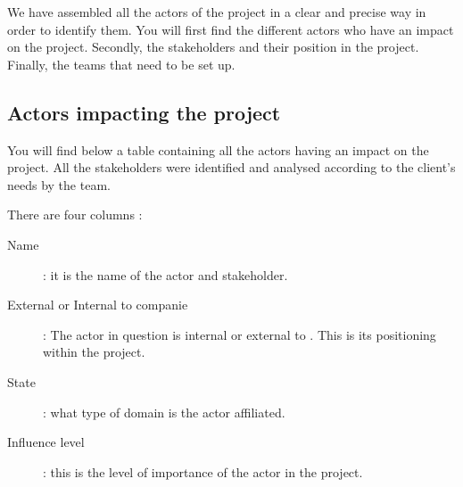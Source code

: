 We have assembled all the actors of the project in a clear and precise way in order to identify them. You will first find the different actors who have an impact on the project. Secondly, the stakeholders and their position in the project. Finally, the teams that need to be set up.

\subsection{Actors impacting the project}

You will find below a table containing all the actors having an impact on the project. All the stakeholders were identified and analysed according to the client's needs by the \companyname team.

There are four columns :

\begin{description}
    \item[Name] : it is the name of the actor and stakeholder.
    \item[External or Internal to \moldco companie] : The actor in question is internal or external to \moldco. This is its positioning within the project.
    \item[State] : what type of domain is the actor affiliated.
    \item[Influence level] : this is the level of importance of the actor in the project.
\end{description} 

